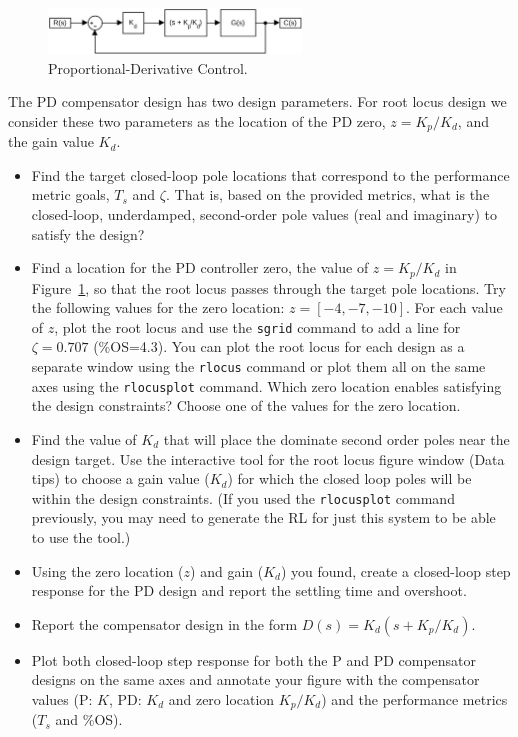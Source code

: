 \documentclass[11pt]{article}
\begin{document}
\begin{figure}[hbt!]
\centering  
\includegraphics [width=0.6\textwidth]{pd_control.png}
\caption{Proportional-Derivative Control.}
\label{f:pd}
\end{figure}

The PD compensator design has two design parameters.   For root locus design we consider these two parameters as the location of the PD zero, $z = K_p/K_d$, and the gain value $K_d$.
\begin{itemize}
\item Find the target closed-loop pole locations that correspond to the performance metric goals, $T_s$ and $\zeta$.  That is, based on the provided metrics, what is the closed-loop, underdamped, second-order pole values (real and imaginary) to satisfy the design?  
\item Find a location for the PD controller zero, the value of $z = K_p/K_d$ in Figure~\ref{f:pd}, so that the root locus passes through the target pole locations.  Try the following values for the zero location: $z = [-4, -7, -10]$.  For each value of $z$, plot the root locus and use the \texttt{sgrid} command to add a line for $\zeta=0.707$ (\%OS=4.3).  You can plot the root locus for each design as a separate window using the \texttt{rlocus} command or plot them all on the same axes using the \texttt{rlocusplot} command.  Which zero location enables satisfying the design constraints?  Choose one of the values for the zero location.
\item Find the value of $K_d$ that will place the dominate second order poles near the design target.  Use the interactive tool for the root locus figure window (Data tips) to choose a gain value ($K_d$) for which the closed loop poles will be within the design constraints. (If you used the \texttt{rlocusplot} command previously, you may need to generate the RL for just this system to be able to use the tool.)  
\item Using the zero location ($z$) and gain ($K_d$) you found, create a closed-loop step response for the PD design and report the settling time and overshoot.
\item Report the compensator design in the form $D(s) = K_d (s + K_p/K_d)$.
  \item Plot both closed-loop step response for both the P and PD compensator designs on the same axes and annotate your figure with the compensator values (P: $K$, PD: $K_d$ and zero location $K_p/K_d$) and the performance metrics ($T_s$ and \%OS).
\end{itemize}
\end{document}
